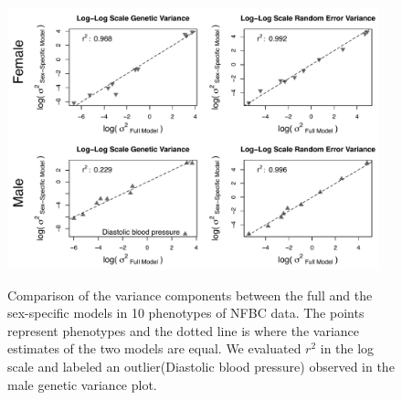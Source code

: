 \documentclass[11pt]{article}
\begin{document}
\begin{figure}[h]
  \centering
  {\includegraphics[width=0.96\textwidth]{../Figures/Fig5/GCTA_summary.pdf}}
  \caption{Comparison of the variance components between the full and the sex-specific
  models in 10 phenotypes of NFBC data. The points represent phenotypes and the
  dotted line is where the variance estimates of the two models are equal. We
evaluated $r^2$ in the log scale and labeled an outlier(Diastolic blood pressure) observed in the male genetic variance plot.}
  \label{gcta_summary}
\end{figure}
\end{document}
